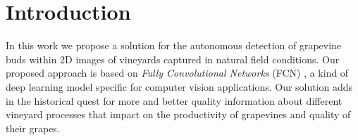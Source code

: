 \documentclass[a4paper,authoryear,review]{elsarticle}
\begin{document}
\linenumbers


\section{Introduction} 

In this work we propose a solution for the autonomous detection of grapevine buds within 2D images of vineyards captured in natural field conditions. Our proposed approach is based on \emph{Fully Convolutional Networks} (FCN) \citep{long2015fully, shelhamer2017fully}, a kind of deep learning model specific for computer vision applications. Our solution adds in the historical quest for more and better quality information about different vineyard processes that impact on the productivity of grapevines and quality of their grapes. 
\end{document}

